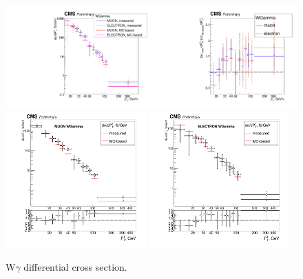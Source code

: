  
\begin{figure}[htb]
  \begin{center}
   \includegraphics[width=0.5\textwidth]{../figs/figs_v11/ChannelsMERGED_WGamma/CrossSection/compareCSWGamma.pdf}\includegraphics[width=0.5\textwidth]{../figs/figs_v11/ChannelsMERGED_WGamma/CrossSection/compareCSratioTheoryWGamma.pdf}
      \includegraphics[width=0.48\textwidth]{../figs/figs_v11/MUON_WGamma/CrossSection/c_CS_MUON_WGamma_UNblind.png} \includegraphics[width=0.48\textwidth]{../figs/figs_v11/ELECTRON_WGamma/CrossSection/c_CS_ELECTRON_WGamma_UNblind.png}
  \caption{W$\gamma$ differential cross section. }
  \label{fig:CS_Wg}
 \end{center}
\end{figure}



